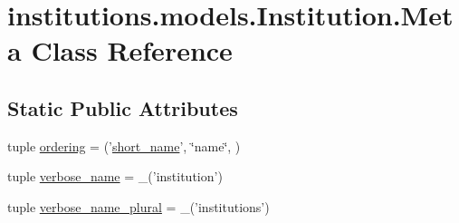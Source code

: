 \hypertarget{classinstitutions_1_1models_1_1_institution_1_1_meta}{\section{institutions.\-models.\-Institution.\-Meta Class Reference}
\label{classinstitutions_1_1models_1_1_institution_1_1_meta}
}
\subsection*{Static Public Attributes}
\begin{DoxyCompactItemize}
\item 
tuple \hyperlink{classinstitutions_1_1models_1_1_institution_1_1_meta_adaac3b680e0de02775c846456cca50b5}{ordering} = ('\hyperlink{classinstitutions_1_1models_1_1_institution_a4bde4b882a3be7afc56f079ef5c3c2f7}{short\-\_\-name}', \char`\"{}name\char`\"{}, )
\item 
tuple \hyperlink{classinstitutions_1_1models_1_1_institution_1_1_meta_a631e658e31e6fe782933029e03e7602c}{verbose\-\_\-name} = \-\_\-('institution')
\item 
tuple \hyperlink{classinstitutions_1_1models_1_1_institution_1_1_meta_a57b359eb54fab0f059028950b752a062}{verbose\-\_\-name\-\_\-plural} = \-\_\-('institutions')
\end{DoxyCompactItemize}


